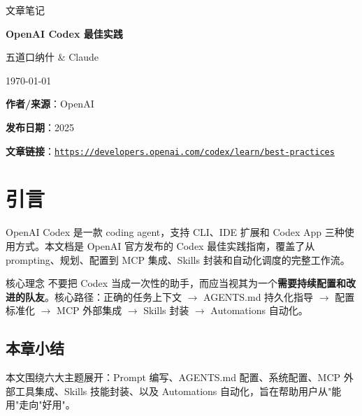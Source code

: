 \documentclass[a4paper]{article}
\newcommand{\notetitle}{OpenAI Codex 最佳实践}
\newcommand{\noteauthors}{五道口纳什 \& Claude}
\newcommand{\notedate}{\today}
\newcommand{\videochannel}{OpenAI}
\newcommand{\videopublishdate}{2025}
\newcommand{\videourl}{https://developers.openai.com/codex/learn/best-practices}
\begin{document}
\begin{titlepage}
\centering
{\Large 文章笔记\par}
\vspace{1.2cm}
{\huge\bfseries \notetitle\par}
\vspace{0.8cm}
{\large \noteauthors\par}
\vspace{0.3cm}
{\large \notedate\par}
\vspace{1.5cm}

\vfill
\begin{tcolorbox}[width=0.9\textwidth, colback=black!2!white, colframe=black!60, sharp corners]
\textbf{作者/来源}：\videochannel\par
\textbf{发布日期}：\videopublishdate\par
\textbf{文章链接}：\href{\videourl}{\nolinkurl{\videourl}}
\end{tcolorbox}
\end{titlepage}

\tableofcontents
\newpage


\section{引言}

OpenAI Codex 是一款 coding agent，支持 CLI、IDE 扩展和 Codex App 三种使用方式。本文档是 OpenAI 官方发布的 Codex 最佳实践指南，覆盖了从 prompting、规划、配置到 MCP 集成、Skills 封装和自动化调度的完整工作流。

\begin{importantbox}{核心理念}
不要把 Codex 当成一次性的助手，而应当视其为一个\textbf{需要持续配置和改进的队友}。核心路径：正确的任务上下文 $\rightarrow$ AGENTS.md 持久化指导 $\rightarrow$ 配置标准化 $\rightarrow$ MCP 外部集成 $\rightarrow$ Skills 封装 $\rightarrow$ Automations 自动化。
\end{importantbox}

\subsection{本章小结}

本文围绕六大主题展开：Prompt 编写、AGENTS.md 配置、系统配置、MCP 外部工具集成、Skills 技能封装、以及 Automations 自动化，旨在帮助用户从"能用"走向"好用"。

\end{document}

